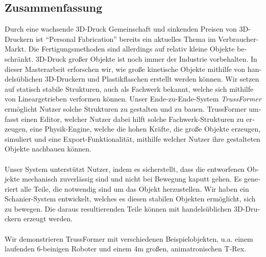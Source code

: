 \begin{otherlanguage}{ngerman}
\chapter*{Zusammenfassung}
Durch eine wachsende 3D-Druck Gemeinschaft und sinkenden Preisen von 3D-Druckern ist ``Personal Fabrication'' bereits ein aktuelles Thema im Verbraucher-Markt. Die Fertigungsmethoden sind allerdings auf relativ kleine Objekte beschränkt. 3D-Druck großer Objekte ist noch immer der Industrie vorbehalten. In dieser Masterarbeit erforschen wir, wie große kinetische Objekte mithilfe von handelsüblichen 3D-Druckern und Plastikflaschen erstellt werden können. Wir setzen auf statisch stabile Strukturen, auch als Fachwerk bekannt, welche sich mithilfe von Lineargetrieben verformen können. Unser Ende-zu-Ende-System \textit{TrussFormer} ermöglicht Nutzer solche Strukturen zu gestalten und zu bauen. TrussFormer umfasst einen Editor, welcher Nutzer dabei hilft solche Fachwerk-Strukturen zu erzeugen, eine Physik-Engine, welche die hohen Kräfte, die große Objekte erzeugen, simuliert und eine Export-Funktionalität, mithilfe welcher Nutzer ihre gestalteten Objekte nachbauen können.\\
\\
Unser System unterstützt Nutzer, indem es sicherstellt, dass die entworfenen Objekte mechanisch zuverlässig sind und nicht bei Bewegung kaputt gehen. Es generiert alle Teile, die notwendig sind um das Objekt herzustellen. Wir haben ein Schanier-System entwickelt, welches es diesen stabilen Objekten ermöglicht, sich zu bewegen. Die daraus resultierenden Teile können mit handelsüblichen 3D-Druckern erzeugt werden.\\
\\
Wir demonstrieren TrussFormer mit verschiedenen Beispielobjekten, u.a. einem laufenden 6-beinigen Roboter und einem 4m großen, animatronischen T-Rex.
\end{otherlanguage}

\endgroup

\vfill
